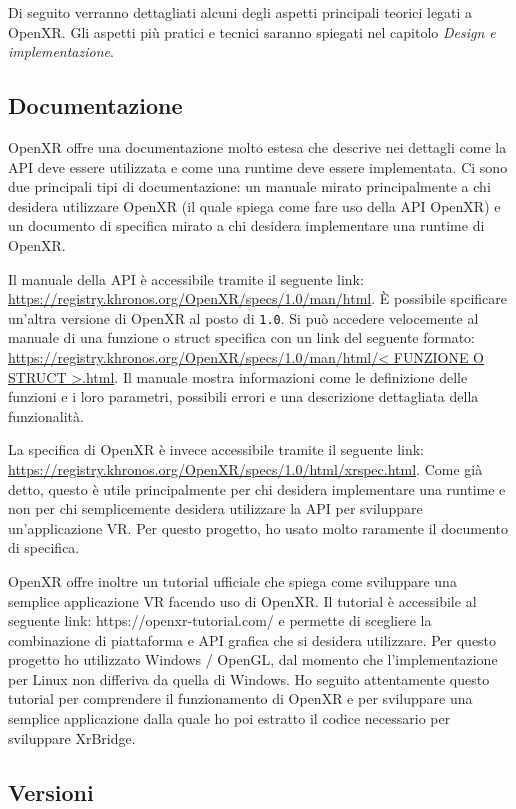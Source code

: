 \documentclass[twoside]{supsistudent}
\begin{document}
Di seguito verranno dettagliati alcuni degli aspetti principali teorici legati a OpenXR. Gli aspetti più pratici e tecnici saranno spiegati nel capitolo \textit{Design e implementazione}.

\subsection{Documentazione}

OpenXR offre una documentazione molto estesa che descrive nei dettagli come la API deve essere utilizzata e come una runtime deve essere implementata. Ci sono due principali tipi di documentazione: un manuale mirato principalmente a chi desidera utilizzare OpenXR (il quale spiega come fare uso della API OpenXR) e un documento di specifica mirato a chi desidera implementare una runtime di OpenXR.

Il manuale della API è accessibile tramite il seguente link: \url{https://registry.khronos.org/OpenXR/specs/1.0/man/html}. È possibile spcificare un'altra versione di OpenXR al posto di \texttt{1.0}. Si può accedere velocemente al manuale di una funzione o struct specifica con un link del seguente formato: \url{https://registry.khronos.org/OpenXR/specs/1.0/man/html/< FUNZIONE O STRUCT >.html}. Il manuale mostra informazioni come le definizione delle funzioni e i loro parametri, possibili errori e una descrizione dettagliata della funzionalità.

La specifica di OpenXR è invece accessibile tramite il seguente link: \url{https://registry.khronos.org/OpenXR/specs/1.0/html/xrspec.html}. Come già detto, questo è utile principalmente per chi desidera implementare una runtime e non per chi semplicemente desidera utilizzare la API per sviluppare un'applicazione VR. Per questo progetto, ho usato molto raramente il documento di specifica.

OpenXR offre inoltre un tutorial ufficiale che spiega come sviluppare una semplice applicazione VR facendo uso di OpenXR. Il tutorial è accessibile al seguente link: https://openxr-tutorial.com/ e permette di scegliere la combinazione di piattaforma e API grafica che si desidera utilizzare. Per questo progetto ho utilizzato Windows / OpenGL, dal momento che l'implementazione per Linux non differiva da quella di Windows. Ho seguito attentamente questo tutorial per comprendere il funzionamento di OpenXR e per sviluppare una semplice applicazione dalla quale ho poi estratto il codice necessario per sviluppare XrBridge.

\subsection{Versioni}
\end{document}
